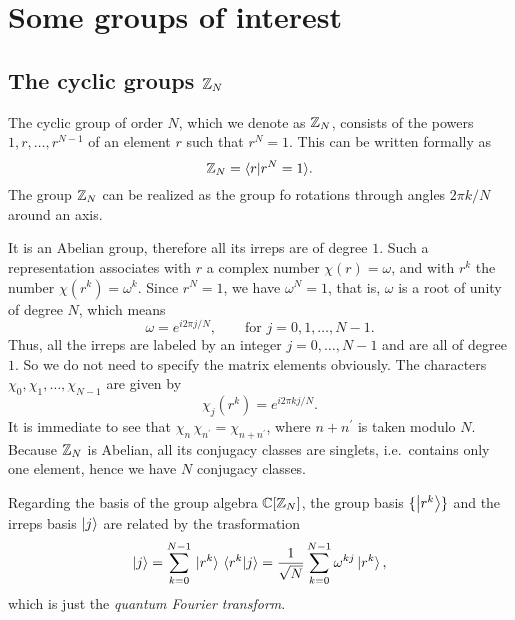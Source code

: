 \chapter{Some groups of interest}
\label{sec:some groups of interest}

%
%
\section{The cyclic groups \texorpdfstring{$\mathbb{Z}_N$}{ZN}}
\label{app:the_cyclic_groups}


The cyclic group of order $N$, which we denote as $\mathbb{Z}_N$, consists of the powers $1, r, \dots, r^{N-1}$ of an element $r$ such that $r^N = 1$.
This can be written formally as
\begin{equation}
    \mathbb{Z}_N = \langle r | r^N = 1 \rangle.
\end{equation}
The group $\mathbb{Z}_N$ can be realized as the group fo rotations through angles $2 \pi k / N$ around an axis.

It is an Abelian group, therefore all its irreps are of degree $1$.
Such a representation associates with $r$ a complex number $\chi(r) = \omega$, and with $r^k$ the number $\chi(r^k) = \omega^k $.
Since $r^N = 1$, we have $\omega^N = 1$, that is, $\omega$ is a root of unity of degree $N$, which means
\begin{equation}
    \omega = e^{i 2 \pi j / N}, \qquad
    \text{for~} j = 0, 1, \dots, N-1.
\end{equation}
Thus, all the irreps are labeled by an integer $j = 0, \dots, N-1$ and are all of degree $1$.
So we do not need to specify the matrix elements obviously.
The characters $\chi_0, \chi_1, \dots, \chi_{N-1}$ are given by
\begin{equation}
    \chi_j(r^k) = e^{i 2 \pi k j / N}.
    \label{eq:character_ZN}
\end{equation}
It is immediate to see that $\chi_n \, \chi_{n^{\prime}} = \chi_{n + n^{\prime}}$, where $n + n^{\prime}$ is taken modulo $N$.
Because $\mathbb{Z}_N$ is Abelian, all its conjugacy classes are singlets, i.e.~contains only one element, hence we have $N$ conjugacy classes.

Regarding the basis of the group algebra $\mathbb{C}[\mathbb{Z}_N]$, the group basis $\{\ket{r^k}\}$ and the irreps basis $\ket{j}$ are related by the trasformation
\begin{equation}
    \ket{j}
    = \sum_{k = 0}^{N-1} \ket*{r^k} \braket*{r^k}{j}
    = \frac{1}{\sqrt{N}} \sum_{k = 0}^{N-1} \omega^{kj} \ket*{r^k},
\end{equation}
which is just the \emph{quantum Fourier transform}.


